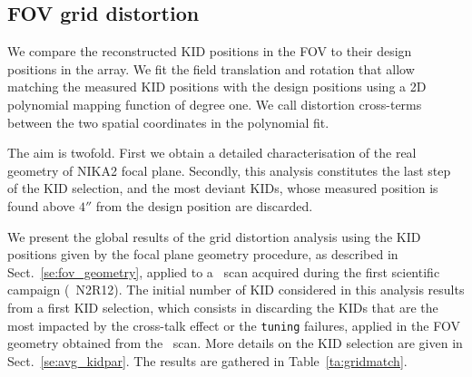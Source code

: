 \subsection{FOV grid distortion}
\label{se:grid_distortion}

We compare the reconstructed KID positions in the FOV to their design
positions in the array. We fit the field translation and rotation that allow
matching the measured KID positions with the design positions using a 2D
polynomial mapping function of degree one. We call distortion cross-terms
between the two spatial coordinates in the polynomial fit.

The aim is twofold. First we obtain a detailed
characterisation of the real geometry of NIKA2 focal plane. Secondly,
this analysis constitutes the last step of the KID
selection, and the most deviant KIDs, whose measured position is found
above $4''$ from the design position are discarded. 

We present the global results of the grid distortion
analysis using the KID positions given
by the focal plane geometry procedure, as described in
Sect.~\ref{se:fov_geometry}, applied to a \bm\ scan acquired
during the first scientific campaign (\aka\ N2R12). 
The initial
number of KID considered in this analysis results from
a first KID selection, which consists in discarding the KIDs that are the most
impacted by the cross-talk effect or the {\tt tuning} failures,
applied in the FOV geometry obtained from the \bm\ scan. More details
on the KID selection are given in Sect.~\ref{se:avg_kidpar}.
The results are gathered in Table~\ref{ta:gridmatch}.

